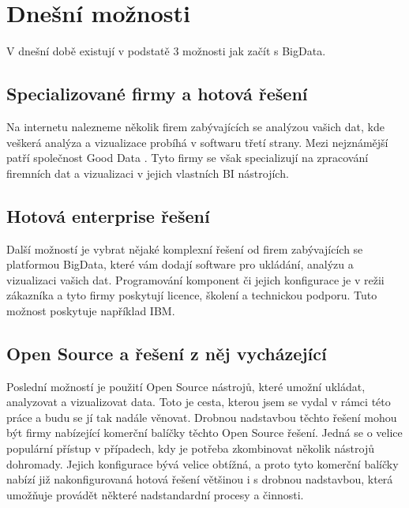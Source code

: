 \section{Dnešní možnosti}
V dnešní době existují v podstatě 3 možnosti jak začít s BigData. 

\subsection{Specializované firmy a hotová řešení}
Na internetu nalezneme několik firem zabývajících se analýzou vašich dat, kde veškerá analýza a vizualizace probíhá v softwaru třetí strany. Mezi nejznámější patří společnost Good Data \cite{gooddata}. Tyto firmy se však specializují na zpracování firemních dat a vizualizaci v jejich vlastních BI nástrojích.

\subsection{Hotová enterprise řešení}
Další možností je vybrat nějaké komplexní řešení od firem zabývajících se platformou BigData, které vám dodají software pro ukládání, analýzu a vizualizaci vašich dat. Programování komponent či jejich konfigurace je v režii zákazníka a tyto firmy poskytují licence, školení a technickou podporu. Tuto možnost poskytuje například IBM.

\subsection{Open Source a řešení z něj vycházející} 
Poslední možností je použití Open Source nástrojů, které umožní ukládat, analyzovat a vizualizovat data. Toto je cesta, kterou jsem se vydal v rámci této práce a budu se jí tak nadále věnovat. Drobnou nadstavbou těchto řešení mohou být firmy nabízející komerční balíčky těchto Open Source řešení. Jedná se o velice populární přístup v případech, kdy je potřeba zkombinovat několik nástrojů dohromady. Jejich konfigurace bývá velice obtížná, a proto tyto komerční balíčky nabízí již nakonfigurovaná hotová řešení většinou i s drobnou nadstavbou, která umožňuje provádět některé nadstandardní procesy a činnosti. 
